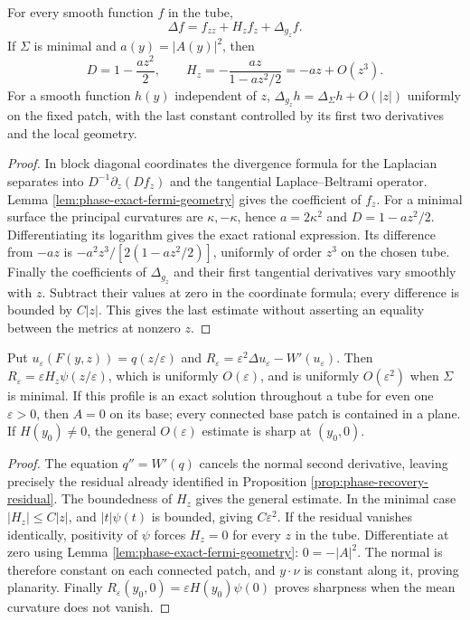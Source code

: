 \begin{proposition}\label{prop:phase-fermi-laplacian}
For every smooth function $f$ in the tube,
\[
 \Delta f=f_{zz}+H_zf_z+\Delta_{g_z}f.
\]
If $\Sigma$ is minimal and $a(y)=|A(y)|^2$, then
\[
 D=1-\frac{a z^2}{2},\qquad
 H_z=-\frac{az}{1-az^2/2}=-az+O(z^3).
\]
For a smooth function $h(y)$ independent of $z$,
$\Delta_{g_z}h=\Delta_\Sigma h+O(|z|)$ uniformly on the fixed patch, with the last constant controlled by its first two derivatives and the local geometry.
\end{proposition}
\begin{proof}
In block diagonal coordinates the divergence formula for the Laplacian separates into
$D^{-1}\partial_z(Df_z)$ and the tangential Laplace--Beltrami operator. Lemma \ref{lem:phase-exact-fermi-geometry} gives the coefficient of $f_z$. For a minimal surface the principal curvatures are $\kappa,-\kappa$, hence $a=2\kappa^2$ and $D=1-az^2/2$. Differentiating its logarithm gives the exact rational expression. Its difference from $-az$ is $-a^2z^3/[2(1-az^2/2)]$, uniformly of order $z^3$ on the chosen tube. Finally the coefficients of $\Delta_{g_z}$ and their first tangential derivatives vary smoothly with $z$. Subtract their values at zero in the coordinate formula; every difference is bounded by $C|z|$. This gives the last estimate without asserting an equality between the metrics at nonzero $z$.
\end{proof}

\begin{proposition}\label{prop:phase-distance-profile-flatness}
Put $u_\varepsilon(F(y,z))=q(z/\varepsilon)$ and
$R_\varepsilon=\varepsilon^2\Delta u_\varepsilon-W'(u_\varepsilon)$.
Then $R_\varepsilon=\varepsilon H_z\psi(z/\varepsilon)$, which is uniformly $O(\varepsilon)$, and is uniformly $O(\varepsilon^2)$ when $\Sigma$ is minimal. If this profile is an exact solution throughout a tube for even one $\varepsilon>0$, then $A=0$ on its base; every connected base patch is contained in a plane. If $H(y_0)\ne0$, the general $O(\varepsilon)$ estimate is sharp at $(y_0,0)$.
\end{proposition}
\begin{proof}
The equation $q''=W'(q)$ cancels the normal second derivative, leaving precisely the residual already identified in Proposition \ref{prop:phase-recovery-residual}. The boundedness of $H_z$ gives the general estimate. In the minimal case $|H_z|\leq C|z|$, and $|t|\psi(t)$ is bounded, giving $C\varepsilon^2$. If the residual vanishes identically, positivity of $\psi$ forces $H_z=0$ for every $z$ in the tube. Differentiate at zero using Lemma \ref{lem:phase-exact-fermi-geometry}: $0=-|A|^2$. The normal is therefore constant on each connected patch, and $y\cdot\nu$ is constant along it, proving planarity. Finally $R_\varepsilon(y_0,0)=\varepsilon H(y_0)\psi(0)$ proves sharpness when the mean curvature does not vanish.
\end{proof}

